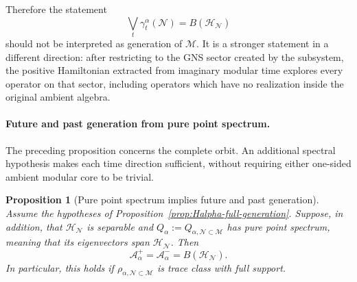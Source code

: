 \documentclass[a4paper,11pt]{article}
\newtheorem{proposition}[theorem]{Proposition}
\theoremstyle{definition}
\newcommand{\mN}{\mathcal{N}}
\newcommand{\mH}{\mathcal{H}}
\newcommand{\mM}{\mathcal{M}}
\begin{document}
Therefore the statement
\begin{equation}
    \bigvee_t\gamma_t^\alpha(\mN)
    =
    B(\mH_{\mN})
\end{equation}
should not be interpreted as generation of $\mM$. It is a stronger
statement in a different direction: after restricting to the GNS sector
created by the subsystem, the positive Hamiltonian extracted from imaginary
modular time explores every operator on that sector, including operators
which have no realization inside the original ambient algebra.

\paragraph{Future and past generation from pure point spectrum.}
The preceding proposition concerns the complete orbit. An additional
spectral hypothesis makes each time direction sufficient, without
requiring either one-sided ambient modular core to be trivial.

\begin{proposition}[Pure point spectrum implies future and past generation]
\label{prop:Halpha-pure-point-one-sided-generation}
Assume the hypotheses of Proposition~\ref{prop:Halpha-full-generation}.
Suppose, in addition, that $\mH_{\mN}$ is separable and
$Q_\alpha:=Q_{\alpha,\mN\subset\mM}$ has pure point spectrum, meaning
that its eigenvectors span $\mH_{\mN}$. Then
\begin{equation}
    \boxed{
    \mathcal A_\alpha^+
    =\mathcal A_\alpha^-
    =B(\mH_{\mN}).
    }
    \label{eq:Halpha-pure-point-one-sided-generation}
\end{equation}
In particular, this holds if
$\rho_{\alpha,\mN\subset\mM}$ is trace class with full support.
\end{proposition}
\end{document}
